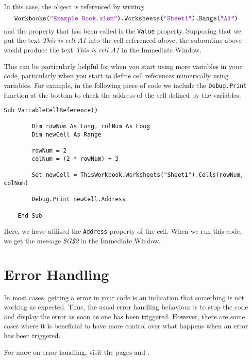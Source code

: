 \documentclass[11pt]{article}%
\begin{document}
In this case, the object is referenced by writing
\[
\texttt{Workbooks(\mauve{"Example Book.xlsm"}).Worksheets(\mauve{"Sheet1"}).Range(\mauve{"A1"})}
\]
and the property that has been called is the \texttt{Value} property. Supposing that we put the text \textit{This is cell A1} into the cell referenced above, the subroutine above would produce the text \textit{This is cell A1} in the Immediate Window.

This can be particularly helpful for when you start using more variables in your code, particularly when you start to define cell references numerically using variables. For example, in the following piece of code we include the \texttt{Debug.Print} function at the bottom to check the address of the cell defined by the variables.\\

\begin{lstlisting}[style=A]
    Sub VariableCellReference()

        Dim rowNum As Long, colNum As Long
        Dim newCell As Range

        rowNum = 2
        colNum = (2 * rowNum) + 3

        Set newCell = ThisWorkbook.Worksheets("Sheet1").Cells(rowNum, colNum)

        Debug.Print newCell.Address

    End Sub
\end{lstlisting}

Here, we have utilised the \texttt{Address} property of the cell. When we run this code, we get the message \textit{\$G\$2} in the Immediate Window.


\section{Error Handling}

In most cases, getting a error in your code is an indication that something is not working as expected. Thus, the usual error handling behaviour is to stop the code and display the error as soon as one has been triggered. However, there are some cases where it is beneficial to have more control over what happens when an error has been triggered.

For more on error handling, visit the pages \cite{ErrorHandlingGuide} and \cite{OnErrorStatement}.
\end{document}
